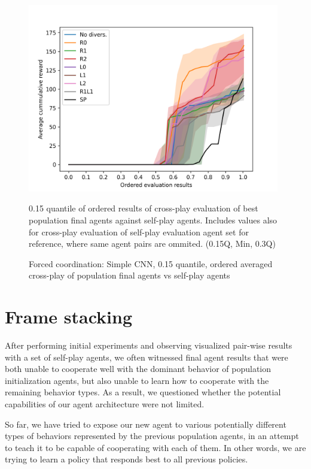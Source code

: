 \begin{figure}[!ht]
    \centering
    \includegraphics*[width=11cm]{../img/SimpleCNNOrderedAvg0.15Q.png}

    \caption{Forced coordination: Simple CNN, 0.15 quantile, ordered averaged cross-play of population final agents vs self-play agents}
    \label{SimpleCNNOrderedAvg0.15Q}
    \medskip
    \small 
    0.15 quantile of ordered results of cross-play evaluation of best population final agents against self-play agents.
    Includes values also for cross-play evaluation of self-play evaluation agent set for reference, where same agent pairs are ommited.
    (0.15Q, Min, 0.3Q)

\end{figure}

\newpage


\section{Frame stacking}
After performing initial experiments and observing visualized pair-wise results with a set of self-play agents, we often witnessed final agent results that were both unable to cooperate well with the dominant behavior of population initialization agents, but also unable to learn how to cooperate with the remaining behavior types.
As a result, we questioned whether the potential capabilities of our agent architecture were not limited.

So far, we have tried to expose our new agent to various potentially different types of behaviors represented by the previous population agents, in an attempt to teach it to be capable of cooperating with each of them.
In other words, we are trying to learn a policy that responds best to all previous policies.

